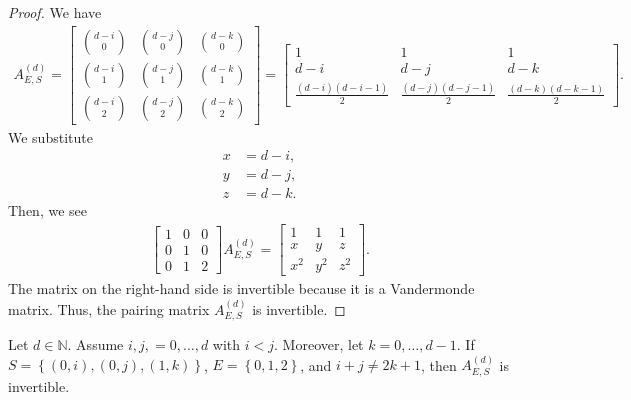 \begin{proof}
    We have 
    \begin{align*}
        A^{(d)}_{E,S} = \begin{bmatrix}
            \binom{d-i}{0} & \binom{d-j}{0} & \binom{d-k}{0} \\
            \binom{d-i}{1} & \binom{d-j}{1} & \binom{d-k}{1} \\
            \binom{d-i}{2} & \binom{d-j}{2} & \binom{d-k}{2}
        \end{bmatrix} = \begin{bmatrix}
            1 & 1 & 1 \\
            d-i & d-j & d-k \\
            \frac{(d-i)(d-i-1)}{2} & \frac{(d-j)(d-j-1)}{2} & \frac{(d-k)(d-k-1)}{2}
        \end{bmatrix}.
    \end{align*}
    We substitute 
    \begin{align*}
        x &= d - i, \\
        y &= d - j, \\
        z &= d - k.
    \end{align*}
    Then, we see
    \begin{align*}
        \begin{bmatrix}
            1 & 0 & 0 \\
            0 & 1 & 0 \\
            0 & 1 & 2
        \end{bmatrix}A^{(d)}_{E,S} = \begin{bmatrix}
            1 & 1 & 1 \\
            x & y & z \\
            x^2 & y^2 & z^2
        \end{bmatrix}.
    \end{align*}
    The matrix on the right-hand side is invertible because it is a Vandermonde matrix. Thus, the pairing matrix \( A^{(d)}_{E,S} \) is invertible.
\end{proof}

\begin{proposition}
    Let \( d \in \mathbb{N} \). Assume \( i,j,=0, \dots, d \) with \( i < j \). Moreover, let \( k=0, \dots, d-1 \). If \( S = \left\{ (0,i), (0,j), (1,k) \right\} \), \( E = \left\{ 0,1,2 \right\} \), and \( i+j \neq 2k + 1 \), then \( A^{(d)}_{E,S} \) is invertible.
\end{proposition}


